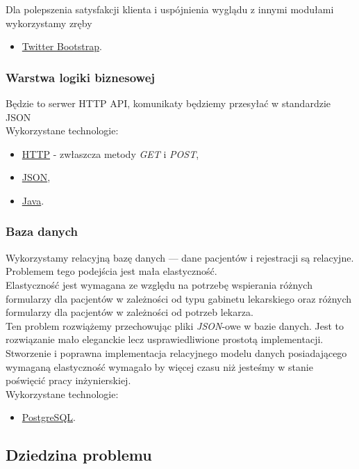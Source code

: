 \documentclass[polish,12pt]{aghthesis}
\begin{document}
Dla polepszenia satysfakcji klienta i uspójnienia wyglądu z innymi modułami wykorzystamy zręby
\begin{itemize}
  \item \href{https://getbootstrap.com/}{Twitter Bootstrap}.
\end{itemize}

\subsubsection{Warstwa logiki biznesowej}
Będzie to serwer HTTP API, komunikaty będziemy przesyłać w standardzie JSON \\
Wykorzystane technologie:
\begin{itemize}
  \item \href{https://pl.wikipedia.org/wiki/Hypertext_Transfer_Protocol}{HTTP} - zwłaszcza metody \emph{GET} i \emph{POST},
  \item \href{http://www.json.org/}{JSON},
  \item \href{https://www.oracle.com/java/index.html}{Java}.
\end{itemize}

\subsubsection{Baza danych}
\label{subsec:wykorzystane-technologie-baza}
Wykorzystamy relacyjną bazę danych --- dane pacjentów i rejestracji są relacyjne. Problemem tego podejścia jest mała elastyczność. \\
Elastyczność jest wymagana ze względu na potrzebę wspierania różnych formularzy dla pacjentów w zależności od typu gabinetu lekarskiego oraz różnych formularzy dla pacjentów w zależności od potrzeb lekarza. \\
Ten problem rozwiążemy przechowując pliki \emph{JSON}-owe w bazie danych. Jest to rozwiązanie mało eleganckie lecz usprawiedliwione prostotą implementacji. Stworzenie i poprawna implementacja relacyjnego modelu danych posiadającego wymaganą elastyczność wymagało by więcej czasu niż jesteśmy w stanie poświęcić pracy inżynierskiej. \\
Wykorzystane technologie:
\begin{itemize}
  \item \href{https://www.postgresql.org/}{PostgreSQL}.
\end{itemize}


\subsection{Dziedzina problemu}
\end{document}
